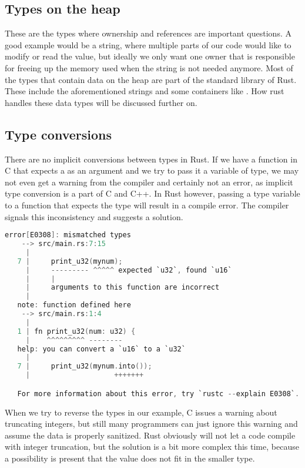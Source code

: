 \subsection{Types on the heap}

These are the types where ownership and references are important questions. A good example would be a string, where multiple parts of our code would like to modify or read the value, but ideally we only want one owner that is responsible for freeing up the memory used when the string is not needed anymore. Most of the types that contain data on the heap are part of the standard library of Rust. These include the aforementioned strings and some containers like . How rust handles these data types will be discussed further on.

\subsection{Type conversions}

There are no implicit conversions between types in Rust. If we have a function in C that expects a  as an argument and we try to pass it a variable of  type, we may not even get a warning from the compiler and certainly not an error, as implicit type conversion is a part of C and C++. In Rust however, passing a  type variable to a function that expects the  type will result in a compile error. The compiler signals this inconsistency and suggests a solution.

\begin{lstlisting}[language=C,frame=single,float=!ht,label={lst:rust-conv-error},caption={Rust Type Conversion Error}]
    error[E0308]: mismatched types
    --> src/main.rs:7:15
     |
   7 |     print_u32(mynum);
     |     --------- ^^^^^ expected `u32`, found `u16`
     |     |
     |     arguments to this function are incorrect
     |
   note: function defined here
    --> src/main.rs:1:4
     |
   1 | fn print_u32(num: u32) {
     |    ^^^^^^^^^ --------
   help: you can convert a `u16` to a `u32`
     |
   7 |     print_u32(mynum.into());
     |                    +++++++

   For more information about this error, try `rustc --explain E0308`.
\end{lstlisting}

When we try to reverse the types in our example, C issues a warning about truncating integers, but still many programmers can just ignore this warning and assume the data is properly sanitized. Rust obviously will not let a code compile with integer truncation, but the solution is a bit more complex this time, because a possibility is present that the value does not fit in the smaller type.

